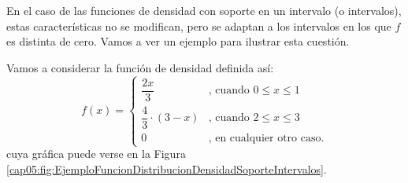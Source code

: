 En el caso de las funciones de densidad con soporte en un intervalo (o intervalos), estas características no se modifican, pero se adaptan a los intervalos en los que $f$ es distinta de cero. Vamos a ver un ejemplo para ilustrar esta cuestión.
\begin{ejemplo}
\label{cap05:ejem:FuncionDistribucionDensidadSoporteIntervalos}
Vamos a considerar la función de densidad definida así:
\[f(x)=
\begin{cases}
\dfrac{2x}{3}&\mbox{, cuando }0\leq x\leq 1\\[3mm]
\dfrac{4}{3}\cdot(3-x)&\mbox{, cuando }2\leq x\leq 3\\[3mm]
0&\mbox{, en cualquier otro caso.}
\end{cases}\]
cuya gráfica puede verse en la Figura \ref{cap05:fig:EjemploFuncionDistribucionDensidadSoporteIntervalos}.


\end{ejemplo}

